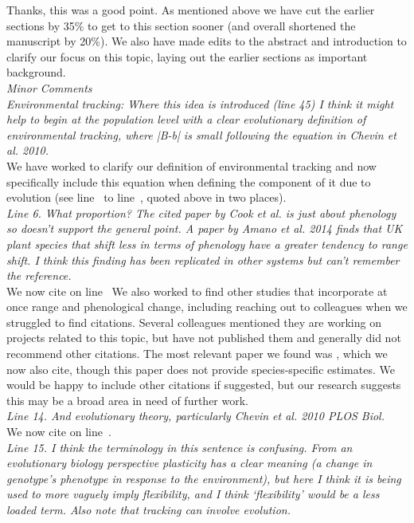 \documentclass[11pt]{article}
\newcommand{\lr}[1]{line~\lineref{#1}}
\begin{document}
Thanks, this was a good point. As mentioned above we have cut the earlier sections by 35\% to get to this section sooner (and overall shortened the manuscript by 20\%). We also have made edits to the abstract and introduction to clarify our focus on this topic, laying out the earlier sections as important background.\\

\emph{Minor Comments\\
Environmental tracking: Where this idea is introduced (line 45) I think it might help to
begin at the population level with a clear evolutionary definition of environmental tracking,
where |B-b| is small following the equation in Chevin et al. 2010.}\\

We have worked to clarify our definition of environmental tracking and now specifically include this equation when defining the component of it due to evolution (see \lr{Bminusbstart} to \lr{moretrackE}, quoted above in two places). \\

\emph{Line 6. What proportion? The cited paper by Cook et al. is just about phenology so doesn't
support the general point. A paper by Amano et al. 2014 finds that UK plant species that
shift less in terms of phenology have a greater tendency to range shift. I think this finding
has been replicated in other systems but can't remember the reference.}\\

We now cite \citet{amano2014} on \lr{r4misc} We also worked to find other studies that incorporate at once range and phenological change, including reaching out to colleagues when we struggled to find citations. Several colleagues mentioned they are working on projects related to this topic, but have not published them and generally did not recommend other citations. The most relevant paper we found was \citet{socolar2017}, which we now also cite, though this paper does not provide species-specific estimates. We would be happy to include other citations if suggested, but our research suggests this may be a broad area in need of further work. \\

\emph{Line 14. And evolutionary theory, particularly Chevin et al. 2010 PLOS Biol.}\\

We now cite \citet{chevin2010} on \lr{r4misc1}.\\

\emph{Line 15. I think the terminology in this sentence is confusing. From an evolutionary biology
perspective plasticity has a clear meaning (a change in genotype's phenotype in response to
the environment), but here I think it is being used to more vaguely imply flexibility, and I
think `flexibility' would be a less loaded term. Also note that tracking can involve
evolution.}\\
\end{document}
